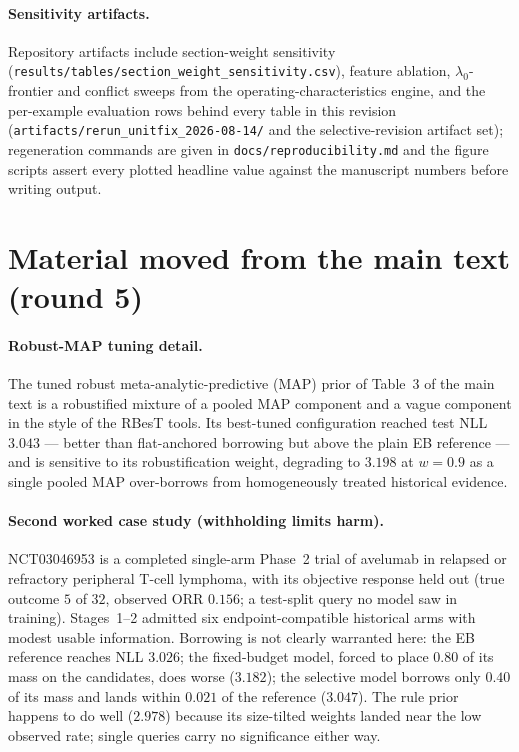 \documentclass[11pt]{article}
\begin{document}
\paragraph{Sensitivity artifacts.} Repository artifacts include section-weight
sensitivity (\texttt{results/tables/\allowbreak section\_weight\_sensitivity.csv}),
feature ablation, $\lambda_0$-frontier and conflict sweeps from the
operating-characteristics engine, and the per-example evaluation rows behind
every table in this revision
(\texttt{artifacts/\allowbreak rerun\_unitfix\_2026-08-14/} and the selective-revision
artifact set); regeneration commands are given in
\texttt{docs/reproducibility.md} and the figure scripts assert every plotted
headline value against the manuscript numbers before writing output.

\section{Material moved from the main text (round 5)}

\paragraph{Robust-MAP tuning detail.} The tuned robust
meta-analytic-predictive (MAP) prior of Table~3 of the main text is a
robustified mixture of a pooled MAP component and a vague component in the
style of the RBesT tools. Its best-tuned configuration reached test NLL
$3.043$ --- better than flat-anchored borrowing but above the plain EB
reference --- and is sensitive to its robustification weight, degrading to
$3.198$ at $w = 0.9$ as a single pooled MAP over-borrows from
homogeneously treated historical evidence.

\paragraph{Second worked case study (withholding limits harm).}
NCT03046953 is a completed single-arm Phase~2 trial of avelumab in
relapsed or refractory peripheral T-cell lymphoma, with its objective
response held out (true outcome $5$ of $32$, observed ORR $0.156$; a
test-split query no model saw in training). Stages~1--2 admitted six
endpoint-compatible historical arms with modest usable information.
Borrowing is not clearly warranted here: the EB reference reaches NLL
$3.026$; the fixed-budget model, forced to place $0.80$ of its mass on
the candidates, does worse ($3.182$); the selective model borrows only
$0.40$ of its mass and lands within $0.021$ of the reference ($3.047$).
The rule prior happens to do well ($2.978$) because its size-tilted
weights landed near the low observed rate; single queries carry no
significance either way.
\end{document}
